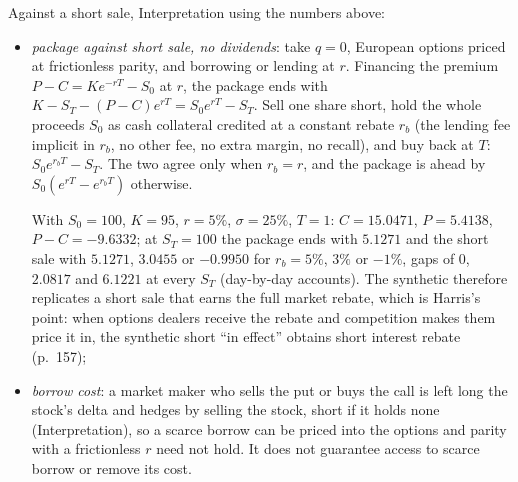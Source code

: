 \begin{qfresult}
 Against a short sale, Interpretation using the numbers above:
\begin{itemize}
\item \emph{package against short sale, no dividends}: take $q=0$, European options priced at frictionless parity, and borrowing or lending at $r$. Financing the premium $P-C=Ke^{-rT}-S_0$ at $r$, the package ends with $K-S_T-(P-C)e^{rT}=S_0e^{rT}-S_T$. Sell one share short, hold the whole proceeds $S_0$ as cash collateral credited at a constant rebate $r_b$ (the lending fee implicit in $r_b$, no other fee, no extra margin, no recall), and buy back at $T$: $S_0e^{r_bT}-S_T$. The two agree only when $r_b=r$, and the package is ahead by $S_0(e^{rT}-e^{r_bT})$ otherwise.

With $S_0=100$, $K=95$, $r=5\%$, $\sigma=25\%$, $T=1$: $C=15.0471$, $P=5.4138$, $P-C=-9.6332$; at $S_T=100$ the package ends with $5.1271$ and the short sale with $5.1271$, $3.0455$ or $-0.9950$ for $r_b=5\%$, $3\%$ or $-1\%$, gaps of $0$, $2.0817$ and $6.1221$ at every $S_T$ (day-by-day accounts). The synthetic therefore replicates a short sale that earns the full market rebate, which is Harris's point: when options dealers receive the rebate and competition makes them price it in, the synthetic short ``in effect'' obtains short interest rebate (p.~157);
\item \emph{borrow cost}: a market maker who sells the put or buys the call is left long the stock's delta and hedges by selling the stock, short if it holds none (Interpretation), so a scarce borrow can be priced into the options and parity with a frictionless $r$ need not hold. It does not guarantee access to scarce borrow or remove its cost.


\end{itemize}
\end{qfresult}
